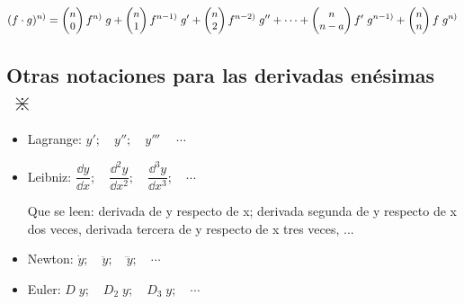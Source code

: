 	\begin{equation}
	\small{
		(f\cdot g)^{n)}=
		\left( \begin{matrix} n \\ 0 \end{matrix} \right) 
		f^{n)} \; g + 
		\left( \begin{matrix} n \\ 1 \end{matrix} \right)
		f^{n-1)}\; g' + 
		\left( \begin{matrix} n \\ 2 \end{matrix} \right) 
		f^{n-2)}\; g'' 
		+ \dots + 
		\left( \begin{matrix} n \\ n-a \end{matrix} \right)  
		f'\; g^{n-1)}+ 
		\left( \begin{matrix} n \\ n \end{matrix} \right) 
		f \; g^{n)} 
		}
	\end{equation}
	
	\subsection{Otras notaciones para las derivadas enésimas $\; \divideontimes$ }
	
	\begin{itemize}
		\item Lagrange: $y'; \quad y''; \quad y'''\; \quad \cdots$
		\item Leibniz: $\dfrac {\dd y}{\dd x}; \quad \dfrac {\dd^2 y}{\dd x^2}; \quad \dfrac {\dd^3 y}{\dd x^3}; \quad \cdots$ 
		
		Que se leen: derivada de y respecto de x; derivada segunda de y respecto de x dos veces, derivada tercera de y respecto de x tres veces, ...
		\item Newton: $\dot { y } ;\quad \ddot { y } ;\quad \dddot { y } ;\quad \cdots $
		\item Euler: $D\; y; \quad D_2\; y; \quad D_3\; y; \quad \cdots$ 
	\end{itemize}
	
	
	
